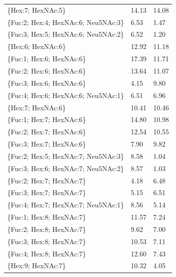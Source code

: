 \begin{table}
\begin{minipage}[t]{0.55\linewidth}
\begin{footnotesize}
\begin{tabular}{l|p{2cm} p{2cm}}
\{Hex:7; HexNAc:5\}                   &                14.13 &              14.08 \\
\{Fuc:2; Hex:4; HexNAc:6; Neu5NAc:3\} &                 6.53 &               1.47 \\
\{Fuc:3; Hex:5; HexNAc:6; Neu5NAc:2\} &                 6.52 &               1.20 \\
\{Hex:6; HexNAc:6\}                   &                12.92 &              11.18 \\
\{Fuc:1; Hex:6; HexNAc:6\}            &                17.39 &              11.71 \\
\{Fuc:2; Hex:6; HexNAc:6\}            &                13.64 &              11.07 \\
\{Fuc:3; Hex:6; HexNAc:6\}            &                 4.15 &               9.80 \\
\{Fuc:4; Hex:6; HexNAc:6; Neu5NAc:1\} &                 6.51 &               6.96 \\
\{Hex:7; HexNAc:6\}                   &                10.41 &              10.46 \\
\{Fuc:1; Hex:7; HexNAc:6\}            &                14.80 &              10.98 \\
\{Fuc:2; Hex:7; HexNAc:6\}            &                12.54 &              10.55 \\
\{Fuc:3; Hex:7; HexNAc:6\}            &                 7.90 &               9.82 \\
\{Fuc:2; Hex:5; HexNAc:7; Neu5NAc:3\} &                 8.58 &               1.04 \\
\{Fuc:3; Hex:6; HexNAc:7; Neu5NAc:2\} &                 8.57 &               1.03 \\
\{Fuc:2; Hex:7; HexNAc:7\}            &                 4.18 &               6.48 \\
\{Fuc:3; Hex:7; HexNAc:7\}            &                 5.15 &               6.51 \\
\{Fuc:4; Hex:7; HexNAc:7; Neu5NAc:1\} &                 8.56 &               5.14 \\
\{Fuc:1; Hex:8; HexNAc:7\}            &                11.57 &               7.24 \\
\{Fuc:2; Hex:8; HexNAc:7\}            &                 9.62 &               7.00 \\
\{Fuc:3; Hex:8; HexNAc:7\}            &                10.53 &               7.11 \\
\{Fuc:4; Hex:8; HexNAc:7\}            &                12.60 &               7.43 \\
\{Hex:9; HexNAc:7\}                   &                10.32 &               4.05 \\
\end{tabular}


\end{footnotesize}
\end{minipage}
\end{table}
